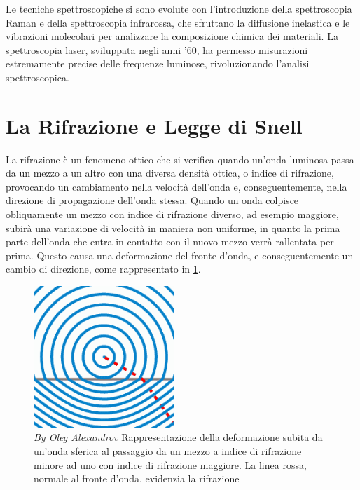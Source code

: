 \documentclass[12pt,a4paper]{report}
\begin{document}
Le tecniche spettroscopiche si sono evolute con l'introduzione della spettroscopia Raman e della spettroscopia infrarossa, che sfruttano la diffusione inelastica e le vibrazioni molecolari per analizzare la composizione chimica dei materiali. La spettroscopia laser, sviluppata negli anni '60, ha permesso misurazioni estremamente precise delle frequenze luminose, rivoluzionando l'analisi spettroscopica.

\section{La Rifrazione e Legge di Snell}

La rifrazione è un fenomeno ottico che si verifica quando un'onda luminosa passa da un mezzo a un altro con una diversa densità ottica, o indice di rifrazione, provocando un cambiamento nella velocità dell'onda e, conseguentemente, nella direzione di propagazione dell'onda stessa. Quando un onda colpisce obliquamente un mezzo con indice di rifrazione diverso, ad esempio maggiore, subirà una variazione di velocità in maniera non uniforme, in quanto la prima parte dell'onda che entra in contatto con il nuovo mezzo verrà rallentata per prima. Questo causa una deformazione del fronte d'onda, e conseguentemente un cambio di direzione, come rappresentato in \ref{fig:wawefrontRefraction}.

\begin{figure}[h!]
    \centering
    \includegraphics[width=200px]{Immagini/Snells_law_wavefronts.png}
    \captionsetup{width=.8\linewidth}
    \caption[\textit{By Oleg Alexandrov}]{\textit{By Oleg Alexandrov\footnotemark} Rappresentazione della deformazione subita da un'onda sferica al passaggio da un mezzo a indice di rifrazione minore ad uno con indice di rifrazione maggiore. La linea rossa, normale al fronte d'onda, evidenzia la rifrazione}
    \label{fig:wawefrontRefraction}
\end{figure}
\end{document}
